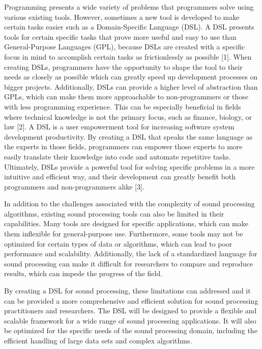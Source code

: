 Programming presents a wide variety of problems that programmers solve using various existing tools. However, sometimes a new tool is developed to make certain tasks easier such as a Domain-Specific Language (DSL). A DSL presents tools for certain specific tasks that prove more useful and easy to use than General-Purpose Languages (GPL), because DSLs are created with a specific focus in mind to accomplish certain tasks as frictionlessly as possible [1]. 
When creating DSLs, programmers have the opportunity to shape the tool to their needs as closely as possible which can greatly speed up development processes on bigger projects.
Additionally, DSLs can provide a higher level of abstraction than GPLs, which can make them more approachable to non-programmers or those with less programming experience. This can be especially beneficial in fields where technical knowledge is not the primary focus, such as finance, biology, or law [2]. A DSL is a user empowerment tool for increasing software system development productivity. By creating a DSL that speaks the same language as the experts in those fields, programmers can empower those experts to more easily translate their knowledge into code and automate repetitive tasks. Ultimately, DSLs provide a powerful tool for solving specific problems in a more intuitive and efficient way, and their development can greatly benefit both programmers and non-programmers alike [3].

In addition to the challenges associated with the complexity of sound processing algorithms, existing sound processing tools can also be limited in their capabilities. Many tools are designed for specific applications, which can make them inflexible for general-purpose use. Furthermore, some tools may not be optimized for certain types of data or algorithms, which can lead to poor performance and scalability. Additionally, the lack of a standardized language for sound processing can make it difficult for researchers to compare and reproduce results, which can impede the progress of the field.

By creating a DSL for sound processing, these limitations can addressed and it can be provided a more comprehensive and efficient solution for sound processing practitioners and researchers. The DSL will be designed to provide a flexible and scalable framework for a wide range of sound processing applications. It will also be optimized for the specific needs of the sound processing domain, including the efficient handling of large data sets and complex algorithms.

